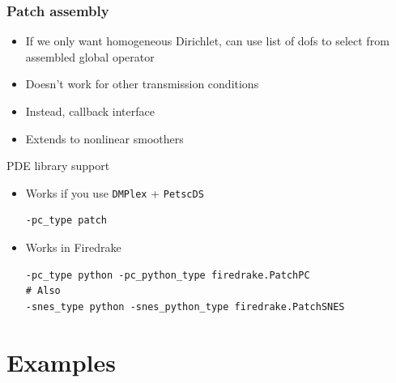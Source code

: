 \documentclass[presentation,aspectratio=43, 10pt]{beamer}
\begin{document}
\begin{frame}[fragile,t]
  \frametitle{Patch assembly}
  \begin{itemize}
  \item If we only want homogeneous Dirichlet, can use list of dofs to
    select from assembled global operator
  \item Doesn't work for other transmission conditions
  \item Instead, callback interface
  \item Extends to nonlinear smoothers
  \end{itemize}

  \begin{block}{PDE library support}
    \begin{itemize}
    \item Works if you use \texttt{DMPlex} + \texttt{PetscDS}
\begin{verbatim}
-pc_type patch
\end{verbatim}
    \item Works in Firedrake
\begin{verbatim}
-pc_type python -pc_python_type firedrake.PatchPC
# Also
-snes_type python -snes_python_type firedrake.PatchSNES
\end{verbatim}
    \end{itemize}
  \end{block}
\end{frame}

\section{Examples}
\end{document}
